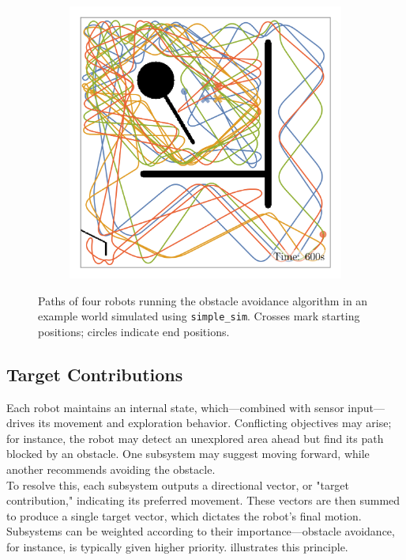 \begin{figure}[H]
\begin{subfigure}[b]{\w}
    \end{subfigure}
    \begin{subfigure}[b]{\w}
        \centering
        \includegraphics[width=\textwidth]{./figures/plots/paths/avoid-obstacles-paths-(after-600s).png}
    \end{subfigure}
    \caption{Paths of four robots running the obstacle avoidance algorithm in an example world simulated using \texttt{simple\_sim}. Crosses mark starting positions; circles indicate end positions.}
    \label{fig:roomba-paths}
\end{figure}

\subsection{Target Contributions}
Each robot maintains an internal state, which—combined with sensor input—drives its movement and exploration behavior. Conflicting objectives may arise; for instance, the robot may detect an unexplored area ahead but find its path blocked by an obstacle. One subsystem may suggest moving forward, while another recommends avoiding the obstacle. \\

To resolve this, each subsystem outputs a directional vector, or "target contribution," indicating its preferred movement. These vectors are then summed to produce a single target vector, which dictates the robot’s final motion. Subsystems can be weighted according to their importance—obstacle avoidance, for instance, is typically given higher priority.  illustrates this principle.

